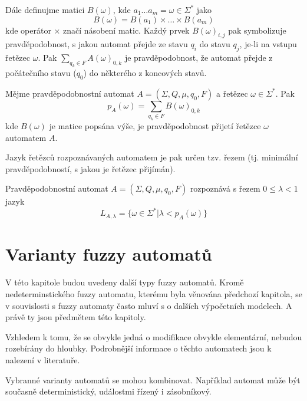 \documentclass[a4paper,10pt]{article}
\begin{document}
Dále definujme matici $B(\omega)$, kde $a_1 \dots a_m = \omega \in \Sigma^*$ jako
$$
  B(\omega) = B(a_1) \times \dots \times B(a_m)
$$
kde operátor $\times$ značí násobení matic. Každý prvek $B(\omega)_{i,j}$ pak symbolizuje pravděpodobnost, s jakou automat přejde ze stavu $q_i$ do stavu $q_j$, je-li na vstupu řetězec $\omega$. Pak $\sum_{q_k \in F} A(\omega)_{0, k}$ je pravděpodobnost, že automat přejde z počátečního stavu ($q_0$) do některého z koncových stavů.

\begin{definition}
 Mějme pravděpodobnostní automat $A = (\Sigma, Q, \mu, q_0, F)$ a řetězec $\omega \in \Sigma^*$. Pak 
 $$
  p_A(\omega) = \sum_{q_k \in F} B(\omega)_{0, k}
 $$ 
 kde $B(\omega)$ je matice popsána výše, je pravděpodobnost přijetí řetězce $\omega$ automatem $A$.
\end{definition}

Jazyk řetězců rozpoznávaných automatem je pak určen tzv. řezem (tj. minimální pravděpodobností, s jakou je řetězec přijímán).
\begin{definition}
 Pravděpodobnostní automat $A = (\Sigma, Q, \mu, q_0, F)$ rozpoznává s řezem $0 \leq \lambda < 1$ jazyk
 $$
  L_{A,\lambda} = \{ \omega \in \Sigma^* | \lambda < p_A(\omega) \}
 $$
\end{definition}




\section{Varianty fuzzy automatů}
V této kapitole budou uvedeny další typy fuzzy automatů. Kromě nedeterminstického fuzzy automatu, kterému byla věnována předchozí kapitola, se v souvislosti s fuzzy automaty často mluví s o dalších výpočetních modelech. A právě ty jsou předmětem této kapitoly. 

Vzhledem k tomu, že se obvykle jedná o modifikace obvykle elementární, nebudou rozebírány do hloubky. Podrobnější informace o těchto automatech jsou k nalezení v literatuře.

\begin{note}
 Vybranné varianty automatů se mohou kombinovat. Například automat může být současně deterministický, událostmi řízený i zásobníkový.
\end{note}
\end{document}

